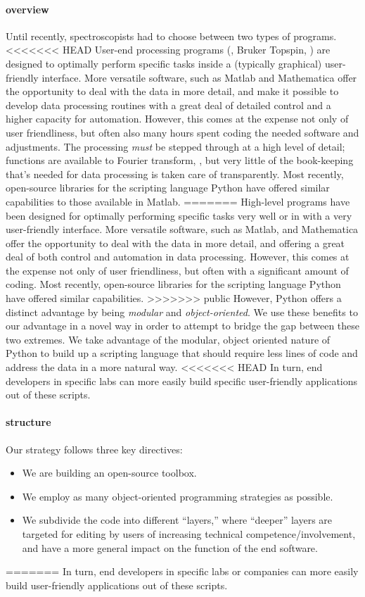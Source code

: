 \paragraph{overview}
Until recently,
    spectroscopists had to choose between two types of programs.
<<<<<<< HEAD
User-end processing programs
    (\eg, Bruker Topspin, \etc)
    are designed to optimally perform specific tasks
    inside a (typically graphical) user-friendly interface.
More versatile software,
    such as Matlab and Mathematica offer the opportunity
    to deal with the data in more detail,
    and make it possible to develop data processing routines
    with a great deal of detailed control
    and a higher capacity for automation.
However,
    this comes at the expense not only of user friendliness,
    but often also many hours spent coding the needed
    software and adjustments.
The processing \textit{must} be stepped through at a high level
    of detail;
    functions are available to Fourier transform, \etc,
    but
    very little of the book-keeping that's needed for data
    processing is taken care of transparently.
Most recently,
    open-source libraries for the scripting language Python have
    offered similar capabilities to those available in Matlab.
=======
High-level
    programs have been designed for optimally performing specific tasks
    very well or in with a very user-friendly interface.
More versatile software,
    such as Matlab, and Mathematica offer the opportunity
    to deal with the data in more detail,
    and offering a great deal of both control and automation in data processing.
However,
    this comes at the expense not only of user friendliness,
    but often with a significant amount of coding.
Most recently,
    open-source libraries for the scripting language Python have
    offered similar capabilities.
>>>>>>> public
However, Python offers a distinct advantage by being {\it modular} and {\it object-oriented}.
We use these benefits to our advantage in a novel way
    in order to attempt to bridge the gap between these two extremes.
We take advantage of the modular, object oriented nature of Python
    to build up a scripting language that should require
    less lines of code and address the data in a more natural way.
<<<<<<< HEAD
In turn, end developers in specific labs
    can more easily build specific user-friendly applications
    out of these scripts.
\paragraph{structure}
Our strategy follows three key directives:
    \begin{itemize}
        \item We are building an open-source toolbox.
        \item We employ as many object-oriented programming strategies as possible.
        \item We subdivide the code into different ``layers,'' where ``deeper'' layers are targeted for editing by users of increasing technical competence/involvement, and have a more general impact on the function of the end software.
    \end{itemize}
=======
In turn, end developers in specific labs or companies
    can more easily build user-friendly applications
    out of these scripts.
